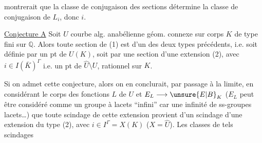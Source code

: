 montrerait que la classe de conjugaison des sections détermine la classe de conjugaison de $L_i$, donc $i$.

\uline{Conjecture A} Soit $U$ courbe alg. anabélienne géom. connexe sur corps $K$ de type fini sur $\mathbb{Q}$. Alors toute section de (1) est  d'un des deux types précédents, i.e. soit définie par un pt de $U(K)$, soit par une section d'une extension (2), avec $i\in I(\bar K)^\Gamma$ i.e. un pt de $\widehat U\setminus U$, rationnel sur $K$.

Si on admet cette conjecture, alors on en conclurait, par passage à la limite, en considérant le corps des fonctions $L$ de $U$ et $E_L\longrightarrow \unsure{E|B}_K$ ($E_L$ peut être considéré comme un groupe à lacets ``infini'' car une infinité de  ss-groupes lacets\ldots) que toute scindage de cette extension provient d'un scindage d'une extension du type (2), avec $i\in I^\Gamma=X(K)$ ($X=\widehat U$). Les classes de tels scindages
